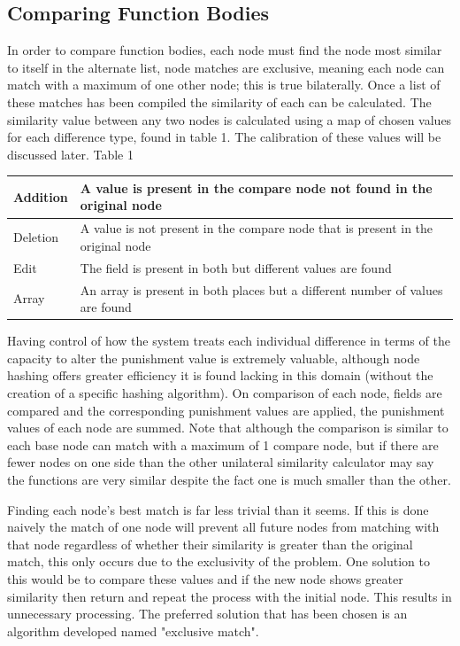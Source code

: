 \documentclass[jou,apacite]{apa6}
\begin{document}
\subsection{Comparing Function Bodies}
In order to compare function bodies, each node must find the node most similar to itself in the alternate list, node matches are exclusive, meaning each node can match with a maximum of one other node; this is true bilaterally. Once a list of these matches has been compiled the similarity of each can be calculated. The similarity value between any two nodes is calculated using a map of chosen values for each difference type, found in table 1.  The calibration of these values will be discussed later.
\newline\newline
Table 1
\begin{tabular}{l|p{50mm}}
  \hline
  Addition & A value is present in the compare
    node not found in the original node\\
  \hline
  Deletion & A value is not present in the compare node that is present in the original node\\
  \hline
  Edit & The field is present in both but different values are found\\
  \hline
  Array & An array is present in both places but a different number of values are found\\
  \hline
\end{tabular}
\newline\newline

Having control of how the system treats each individual difference in terms of the capacity to alter the punishment value is extremely valuable, although node hashing offers greater efficiency it is found lacking in this domain (without the creation of a specific hashing algorithm). On comparison of each node, fields are compared and the corresponding punishment values are applied, the punishment values of each node are summed. Note that although the comparison is similar to each base node can match with a maximum of 1 compare node, but if there are fewer nodes on one side than the other unilateral similarity calculator may say the functions are very similar despite the fact one is much smaller than the other. 

Finding each node’s best match is far less trivial than it seems. If this is done naively the match of one node will prevent all future nodes from matching with that node regardless of whether their similarity is greater than the original match, this only occurs due to the exclusivity of the problem. One solution to this would be to compare these values and if the new node shows greater similarity then return and repeat the process with the initial node. This results in unnecessary processing. The preferred solution that has been chosen is an algorithm developed named "exclusive match".
\end{document}
